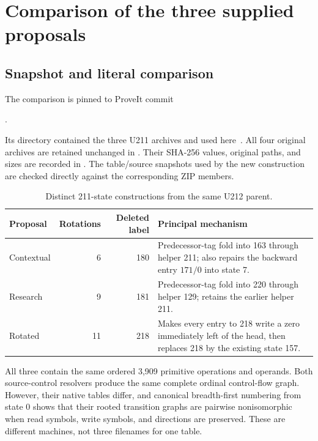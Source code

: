 \section{Comparison of the three supplied proposals}\label{sec:comparison}

\subsection{Snapshot and literal comparison}
The comparison is pinned to ProveIt commit
\begin{center}\small
{}.
\end{center}
Its  directory contained the three U211 archives and
 used here~\cite{snapshot}.
All four original archives are retained unchanged in .
Their SHA-256 values, original paths, and sizes are recorded in
. The table/source snapshots used by the new construction
are checked directly against the corresponding ZIP members.

\begin{table}[ht]
\centering\small
\begin{tabularx}{\linewidth}{@{}lrrX@{}}
\toprule
Proposal & Rotations & Deleted label & Principal mechanism\\
\midrule
Contextual & 6 & 180 &
Predecessor-tag fold into 163 through helper 211;
also repairs the backward entry \(171/0\) into state 7.\\
Research & 9 & 181 &
Predecessor-tag fold into 220 through helper 129;
retains the earlier helper 211.\\
Rotated & 11 & 218 &
Makes every entry to 218 write a zero immediately left of the head,
then replaces 218 by the existing state 157.\\
\bottomrule
\end{tabularx}
\caption{Distinct 211-state constructions from the same U212 parent.}
\end{table}

All three contain the same ordered 3,909 primitive operations and operands.
Both source-control resolvers produce the same complete ordinal control-flow
graph. However, their native tables differ, and canonical breadth-first
numbering from state 0 shows that their rooted transition graphs are pairwise
nonisomorphic when read symbols, write symbols, and directions are preserved.
These are different machines, not three filenames for one table.

